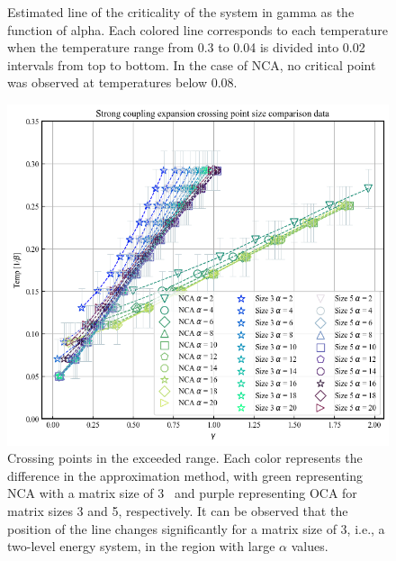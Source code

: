 \documentclass{article}[12pt]
\begin{document}
\begin{spacing}{1.5}
\begin{figure}[htbp]
  \caption{Estimated line of the criticality of the system in gamma as the function of alpha. 
  Each colored line corresponds to each temperature when the temperature range from 0.3 to 0.04 is divided into 0.02 intervals 
  from top to bottom. In the case of NCA, no critical point was observed at temperatures below 0.08.}
\end{figure}
\pagebreak
\newpage
\begin{figure}[H]
  \centerline{\includegraphics[width=12cm]{TexFigure/output.png}}
  \caption{Crossing points in the exceeded range. Each color represents the difference in the approximation method, 
  with green representing NCA with a matrix size of 3  and purple representing OCA for matrix sizes 3 and 5, respectively. 
  It can be observed that the position of the line changes significantly for a matrix size of 3, i.e., a two-level energy system, 
  in the region with large $\alpha$ values.}
 \end{figure}
\end{spacing}
\end{document}
